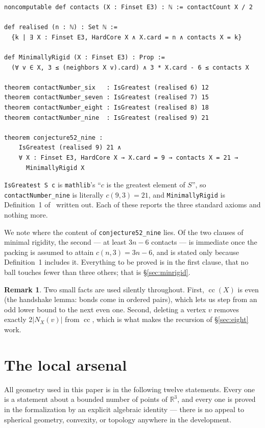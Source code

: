 \documentclass[11pt,a4paper]{article}
\theoremstyle{plain}
\theoremstyle{definition}
\newtheorem{remark}[theorem]{Remark}
\newcommand{\R}{\mathbb{R}}
\newcommand{\card}[1]{\lvert #1 \rvert}
\begin{document}
\begin{Verbatim}
noncomputable def contacts (X : Finset E3) : ℕ := contactCount X / 2

def realised (n : ℕ) : Set ℕ :=
  {k | ∃ X : Finset E3, HardCore X ∧ X.card = n ∧ contacts X = k}

def MinimallyRigid (X : Finset E3) : Prop :=
  (∀ v ∈ X, 3 ≤ (neighbors X v).card) ∧ 3 * X.card - 6 ≤ contacts X

theorem contactNumber_six   : IsGreatest (realised 6) 12
theorem contactNumber_seven : IsGreatest (realised 7) 15
theorem contactNumber_eight : IsGreatest (realised 8) 18
theorem contactNumber_nine  : IsGreatest (realised 9) 21

theorem conjecture52_nine :
    IsGreatest (realised 9) 21 ∧
    ∀ X : Finset E3, HardCore X → X.card = 9 → contacts X = 21 →
      MinimallyRigid X
\end{Verbatim}

\noindent \texttt{IsGreatest S c} is \texttt{mathlib}'s ``$c$ is the greatest element of
$S$'', so \texttt{contactNumber\_nine} is literally $c(9,3) = 21$, and
\texttt{MinimallyRigid} is Definition~1 of~\cite{BezdekKhan2018} written out. Each of
these reports the three standard axioms and nothing more.

We note where the content of \texttt{conjecture52\_nine} lies. Of the two clauses of
minimal rigidity, the second --- at least $3n-6$ contacts --- is immediate once the
packing is assumed to attain $c(n,3) = 3n-6$, and is stated only because Definition~1
includes it. Everything to be proved is in the first clause, that no ball touches fewer
than three others; that is \S\ref{sec:minrigid}.

\begin{remark}
Two small facts are used silently throughout. First, $\operatorname{cc}(X)$ is even
(the handshake lemma: bonds come in ordered pairs), which lets us step from an odd
lower bound to the next even one. Second, deleting a vertex $v$ removes exactly
$2\card{N_X(v)}$ from $\operatorname{cc}$, which is what makes the recursion of
\S\ref{sec:eight} work.
\end{remark}

\section{The local arsenal}
\label{sec:arsenal}

All geometry used in this paper is in the following twelve statements. Every one is
a statement about a bounded number of points of $\R^3$, and every one is proved in the
formalization by an explicit algebraic identity --- there is no appeal to spherical
geometry, convexity, or topology anywhere in the development.
\end{document}
